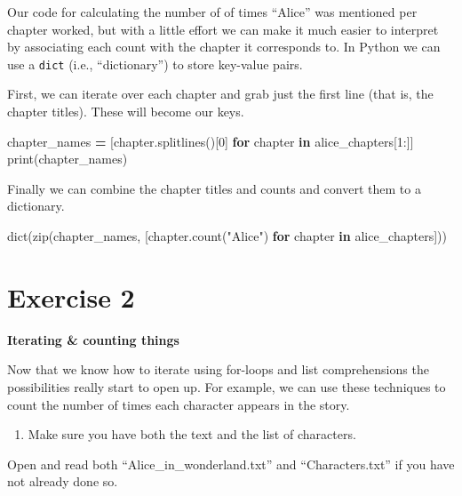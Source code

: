 \documentclass[]{book}
\newenvironment{Shaded}{\begin{snugshade}}{\end{snugshade}}
\newcommand{\KeywordTok}[1]{\textcolor[rgb]{0.13,0.29,0.53}{\textbf{#1}}}
\newcommand{\DecValTok}[1]{\textcolor[rgb]{0.00,0.00,0.81}{#1}}
\newcommand{\StringTok}[1]{\textcolor[rgb]{0.31,0.60,0.02}{#1}}
\newcommand{\ControlFlowTok}[1]{\textcolor[rgb]{0.13,0.29,0.53}{\textbf{#1}}}
\newcommand{\OperatorTok}[1]{\textcolor[rgb]{0.81,0.36,0.00}{\textbf{#1}}}
\newcommand{\BuiltInTok}[1]{#1}
\newcommand{\NormalTok}[1]{#1}
\providecommand{\tightlist}{%
  \setlength{\itemsep}{0pt}\setlength{\parskip}{0pt}}
\begin{document}
Our code for calculating the number of of times ``Alice'' was mentioned
per chapter worked, but with a little effort we can make it much easier
to interpret by associating each count with the chapter it corresponds
to. In Python we can use a \texttt{dict} (i.e., ``dictionary'') to store
key-value pairs.

First, we can iterate over each chapter and grab just the first line
(that is, the chapter titles). These will become our keys.

\begin{Shaded}
\begin{Highlighting}[]
\NormalTok{chapter_names }\OperatorTok{=}\NormalTok{ [chapter.splitlines()[}\DecValTok{0}\NormalTok{] }\ControlFlowTok{for}\NormalTok{ chapter }\KeywordTok{in}\NormalTok{ alice_chapters[}\DecValTok{1}\NormalTok{:]]}
\BuiltInTok{print}\NormalTok{(chapter_names)}
\end{Highlighting}
\end{Shaded}

Finally we can combine the chapter titles and counts and convert them to
a dictionary.

\begin{Shaded}
\begin{Highlighting}[]
\BuiltInTok{dict}\NormalTok{(}\BuiltInTok{zip}\NormalTok{(chapter_names, }
\NormalTok{         [chapter.count(}\StringTok{"Alice"}\NormalTok{) }
          \ControlFlowTok{for}\NormalTok{ chapter }\KeywordTok{in}\NormalTok{ alice_chapters]))}
\end{Highlighting}
\end{Shaded}

\section{Exercise 2}\label{exercise-2-3}

\textbf{Iterating \& counting things}

Now that we know how to iterate using for-loops and list comprehensions
the possibilities really start to open up. For example, we can use these
techniques to count the number of times each character appears in the
story.

\begin{enumerate}
\def\labelenumi{\arabic{enumi}.}
\tightlist
\item
  Make sure you have both the text and the list of characters.
\end{enumerate}

Open and read both ``Alice\_in\_wonderland.txt'' and ``Characters.txt''
if you have not already done so.
\end{document}
